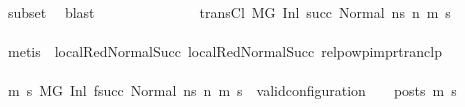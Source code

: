 \begin{isabellebody}
\ subset\ \isamarkupfalse%
\ blast\isanewline
\ \ \isanewline
\ \ \ \ \ \ \ \ \ \ \isamarkupfalse%
\ transCl{\isacharcolon}{\kern0pt}\ {\isachardoublequoteopen}M{\isacharcomma}{\kern0pt}{\isasymLambda}{\isacharcomma}{\kern0pt}{\isasymGamma}{\isacharcomma}{\kern0pt}{\isasymOmega}{\isacharcomma}{\kern0pt}G\ {\isasymturnstile}{\isacharparenleft}{\kern0pt}Inl\ succ{\isacharcomma}{\kern0pt}\ Normal\ ns{\isacharprime}{\kern0pt}{\isacharparenright}{\kern0pt}\ {\isacharminus}{\kern0pt}n{\isasymrightarrow}{\isacharasterisk}{\kern0pt}\ {\isacharparenleft}{\kern0pt}m{\isacharprime}{\kern0pt}{\isacharcomma}{\kern0pt}\ s{\isacharprime}{\kern0pt}{\isacharparenright}{\kern0pt}{\isachardoublequoteclose}\isanewline
\ \ \ \ \ \ \ \ \ \ \ \ \isamarkupfalse%
\ {\isacharparenleft}{\kern0pt}metis\ {\isachardoublequoteopen}{}{\isachardoublequoteclose}{\isacharparenleft}{\kern0pt}{}{\isacharparenright}{\kern0pt}\ local{\isachardot}{\kern0pt}RedNormalSucc{\isacharparenleft}{\kern0pt}{}{\isacharparenright}{\kern0pt}\ local{\isachardot}{\kern0pt}RedNormalSucc{\isacharparenleft}{\kern0pt}{}{\isacharparenright}{\kern0pt}\ relpowp{\isacharunderscore}{\kern0pt}imp{\isacharunderscore}{\kern0pt}rtranclp{\isacharparenright}{\kern0pt}\isanewline
\ \ \isanewline
\ \ \ \ \ \ \ \ \ \ \isamarkupfalse%
\ {\isachardoublequoteopen}{\isasymforall}m{}{\isacharprime}{\kern0pt}\ s{}{\isacharprime}{\kern0pt}{\isachardot}{\kern0pt}{\isacharparenleft}{\kern0pt}\ M{\isacharcomma}{\kern0pt}{\isasymLambda}{\isacharcomma}{\kern0pt}{\isasymGamma}{\isacharcomma}{\kern0pt}{\isasymOmega}{\isacharcomma}{\kern0pt}G{\isacharprime}{\kern0pt}\ {\isasymturnstile}{\isacharparenleft}{\kern0pt}Inl\ {\isacharparenleft}{\kern0pt}f{\isacharparenleft}{\kern0pt}succ{\isacharparenright}{\kern0pt}{\isacharparenright}{\kern0pt}{\isacharcomma}{\kern0pt}\ Normal\ ns{\isacharprime}{\kern0pt}{\isacharparenright}{\kern0pt}\ {\isacharminus}{\kern0pt}n{\isasymrightarrow}{\isacharasterisk}{\kern0pt}\ {\isacharparenleft}{\kern0pt}m{}{\isacharprime}{\kern0pt}{\isacharcomma}{\kern0pt}\ s{}{\isacharprime}{\kern0pt}{\isacharparenright}{\kern0pt}{\isacharparenright}{\kern0pt}\ {\isasymlongrightarrow}\ valid{\isacharunderscore}{\kern0pt}configuration\ {\isasymLambda}\ {\isasymGamma}\ {\isasymOmega}\ posts\ m{}{\isacharprime}{\kern0pt}\ s{}{\isacharprime}{\kern0pt}{\isachardoublequoteclose}\isanewline
\ \ \ \ \ \ \ \ \ \ \ \ \isamarkupfalse%

\end{isabellebody}

